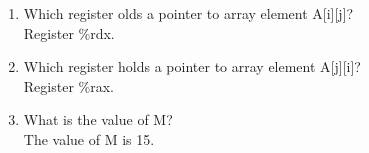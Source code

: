 \documentclass{article}
\begin{document}
\begin{enumerate}[label=\textbf{\Alph*.}]
	\item Which register olds a pointer to array element A[i][j]? \\
	Register \%rdx.
	\item Which register holds a pointer to array element A[j][i]? \\
	Register \%rax.
	\item What is the value of M? \\
	The value of M is 15.
\end{enumerate}
\end{document}
